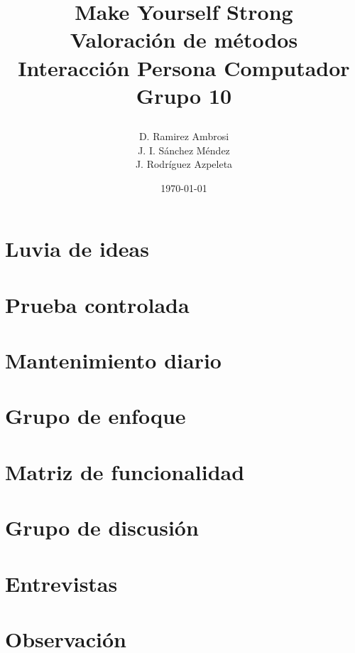 \documentclass[a4paper]{article}
\date{}
\author{D. Ramirez Ambrosi \\ J. I. Sánchez Méndez \\ J. Rodríguez Azpeleta}
\title{\begin{center}
\textbf{\Huge{Make Yourself Strong}} \\ Valoración de métodos  \\ Interacción Persona Computador \\ \Huge{Grupo 10}
\end{center}}
\date{\today}
\renewcommand\listfigurename{\centering LISTA DE FIGURAS}
\begin{document}
\maketitle

\thispagestyle{empty}%
\newpage
\tableofcontents%
\thispagestyle{empty}
\newpage





\setcounter{page}{1}%

\section{Luvia de ideas}

\section{Prueba controlada}

\section{Mantenimiento diario}

\section{Grupo de enfoque}

\section{Matriz de funcionalidad}

\section{Grupo de discusión}

\section{Entrevistas}

\section{Observación}
\end{document}
